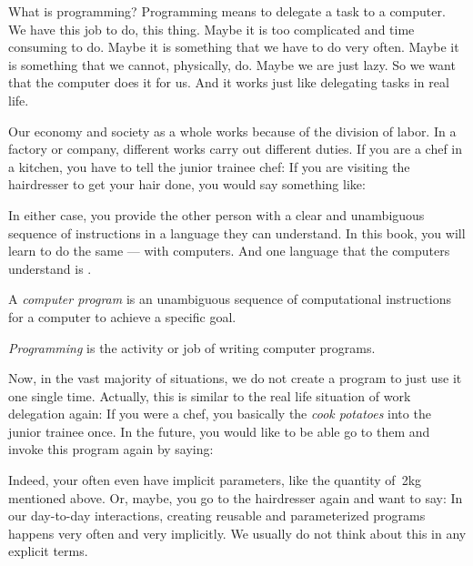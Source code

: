 %
What is programming?
Programming means to delegate a task to a computer.
We have this job to do, this thing.
Maybe it is too complicated and time consuming to do.
Maybe it is something that we have to do very often.
Maybe it is something that we cannot, physically, do.
Maybe we are just lazy.
So we want that the computer does it for us.
And it works just like delegating tasks in real life.

Our economy and society as a whole works because of the division of labor.
In a factory or company, different works carry out different duties.
If you are a chef in a kitchen, you have to tell the junior trainee chef:
If you are visiting the hairdresser to get your hair done, you would say something like:

In either case, you provide the other person with a clear and unambiguous sequence of instructions in a language they can understand.
In this book, you will learn to do the same --- with computers.
And one language that the computers understand is \python.
%
\begin{definition}%
A \emph{computer program} is an unambiguous sequence of computational instructions for a computer to achieve a specific goal.%
\end{definition}%
\begin{definition}[Programming]%
\label{def:programming}
\emph{Programming} is the activity or job of writing computer programs.%
\end{definition}%
%
Now, in the vast majority of situations, we do not create a program to just use it one single time.
Actually, this is similar to the real life situation of work delegation again:
If you were a chef, you basically  the  \emph{cook potatoes} into the junior trainee once.
In the future, you would like to be able go to them and invoke this program again by saying:

Indeed, your  often even have implicit parameters, like the quantity of~2kg mentioned above.
Or, maybe, you go to the hairdresser again and want to say: 
In our day-to-day interactions, creating reusable and parameterized programs happens very often and very implicitly.
We usually do not think about this in any explicit terms.

